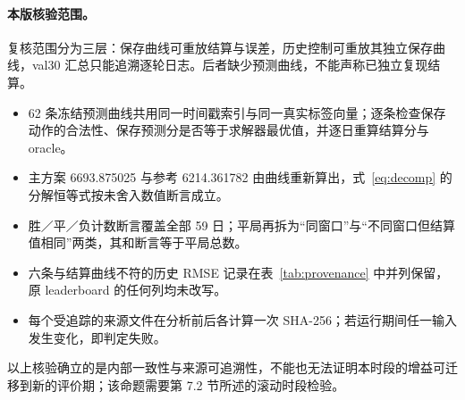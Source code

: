 \documentclass[11pt,a4paper]{article}
\begin{document}
\paragraph{本版核验范围。}
复核范围分为三层：保存曲线可重放结算与误差，历史控制可重放其独立保存曲线，val30 汇总只能追溯逐轮日志。后者缺少预测曲线，不能声称已独立复现结算。

\begin{itemize}\small\raggedright
\item 62 条冻结预测曲线共用同一时间戳索引与同一真实标签向量；逐条检查保存动作的合法性、保存预测分是否等于求解器最优值，并逐日重算结算分与 oracle。
\item 主方案 6693.875025 与参考 6214.361782 由曲线重新算出，式~\eqref{eq:decomp} 的分解恒等式按未舍入数值断言成立。
\item 胜／平／负计数断言覆盖全部 59 日；平局再拆为“同窗口”与“不同窗口但结算值相同”两类，其和断言等于平局总数。
\item 六条与结算曲线不符的历史 RMSE 记录在表~\ref{tab:provenance} 中并列保留，原 leaderboard 的任何列均未改写。
\item 每个受追踪的来源文件在分析前后各计算一次 SHA-256；若运行期间任一输入发生变化，即判定失败。
\end{itemize}

以上核验确立的是内部一致性与来源可追溯性，不能也无法证明本时段的增益可迁移到新的评价期；该命题需要第 7.2 节所述的滚动时段检验。
\end{document}
